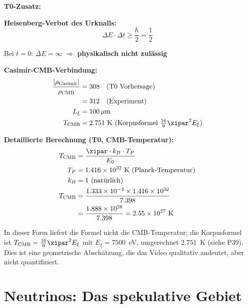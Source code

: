 	\begin{vorteil}
		\textbf{T0-Zusatz:}
		
		\textbf{Heisenberg-Verbot des Urknalls:}
		\begin{equation}
			\Delta E \cdot \Delta t \geq \frac{\hbar}{2} = \frac{1}{2}
		\end{equation}
		
		Bei $t = 0$: $\Delta E = \infty$ $\Rightarrow$ \textbf{physikalisch nicht zulässig}
		
		\textbf{Casimir-CMB-Verbindung:}
		\begin{align}
			\frac{|\rho_{\text{Casimir}}|}{\rho_{\text{CMB}}} &= 308 \quad \text{(T0 Vorhersage)} \\
			&= 312 \quad \text{(Experiment)} \\
			L_\xi &= 100 \, \mu\text{m} \\
			T_{\text{CMB}} &= 2.751 \text{ K (Korpusformel } \tfrac{16}{9}\xipar^2 E_\xi\text{)}
		\end{align}
		
		\textbf{Detaillierte Berechnung (T0, CMB-Temperatur):}
		\begin{align}
			T_{\text{CMB}} &= \frac{\xipar \cdot k_B \cdot T_P}{E_0} \\
			T_P &= 1.416 \times 10^{32} \text{ K (Planck-Temperatur)} \\
			k_B &= 1 \text{ (natürlich)} \\
			T_{\text{CMB}} &= \frac{1.333 \times 10^{-4} \times 1.416 \times 10^{32}}{7.398} \\
			&= \frac{1.888 \times 10^{28}}{7.398} = 2.55 \times 10^{27} \text{ K}
		\end{align}
		
		In dieser Form liefert die Formel nicht die CMB-Temperatur; die Korpusformel ist $T_{\text{CMB}} = \frac{16}{9}\xipar^2 E_\xi$ mit $E_\xi = 7500$~eV, umgerechnet $2.751$~K (siehe P39). Dies ist eine geometrische Abschätzung, die das Video qualitativ andeutet, aber nicht quantifiziert.
	\end{vorteil}
	
	\section{Neutrinos: Das spekulative Gebiet}
	
